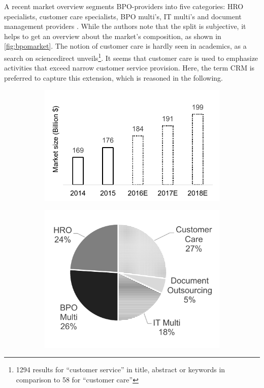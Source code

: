 		A recent market overview segments BPO-providers into five categories: \acrfull{HRO} specialists, customer care specialists, BPO multi's, IT multi's and document management providers \citep{hfs2016top}.  While the authors note that the split is subjective, it helps to get an overview about the market's composition, as shown in \Fig \ref{fig:bpomarket}. The notion of customer care is hardly seen in academics, as a search on sciencedirect unveils\footnote{1294 results for \enquote{customer service} in title, abstract or keywords in comparison to 58 for \enquote{customer care}}. It seems that customer care is used to emphasize activities that exceed narrow customer service provision. Here, the term \acrshort{CRM} is preferred to capture this extension, which is reasoned in the following.	
			
		\begin{figure}[caption={BPO market composition}, label={fig:bpomarket}]
			{
				\begin{subfigure}[b]{0.45\textwidth}
					\includegraphics[width=.8\textwidth]{figures/bpomarket.pdf}
				\end{subfigure}
			\begin{subfigure}[b]{0.45\textwidth}
				\includegraphics[width=.8\textwidth]{figures/bpotypes.pdf}
			\end{subfigure}
					
		 \parbox{0.8\textwidth}{	} }
			
		\end{figure}

